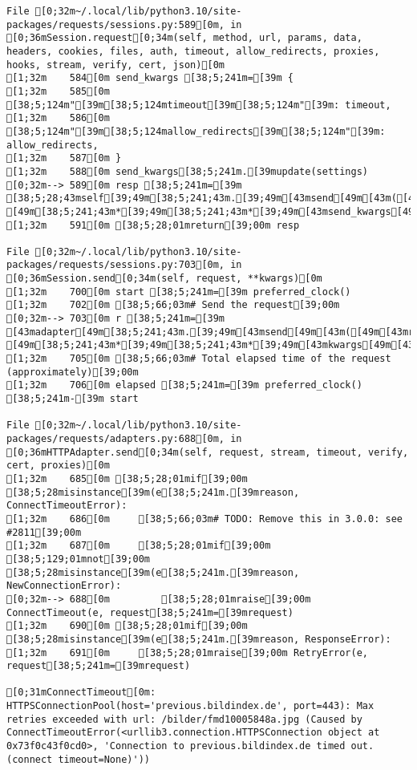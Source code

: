 \documentclass[
  a4paper,
  portrait]{book}
\begin{document}
\begin{verbatim}
File [0;32m~/.local/lib/python3.10/site-packages/requests/sessions.py:589[0m, in [0;36mSession.request[0;34m(self, method, url, params, data, headers, cookies, files, auth, timeout, allow_redirects, proxies, hooks, stream, verify, cert, json)[0m
[1;32m    584[0m send_kwargs [38;5;241m=[39m {
[1;32m    585[0m     [38;5;124m"[39m[38;5;124mtimeout[39m[38;5;124m"[39m: timeout,
[1;32m    586[0m     [38;5;124m"[39m[38;5;124mallow_redirects[39m[38;5;124m"[39m: allow_redirects,
[1;32m    587[0m }
[1;32m    588[0m send_kwargs[38;5;241m.[39mupdate(settings)
[0;32m--> 589[0m resp [38;5;241m=[39m [38;5;28;43mself[39;49m[38;5;241;43m.[39;49m[43msend[49m[43m([49m[43mprep[49m[43m,[49m[43m [49m[38;5;241;43m*[39;49m[38;5;241;43m*[39;49m[43msend_kwargs[49m[43m)[49m
[1;32m    591[0m [38;5;28;01mreturn[39;00m resp

File [0;32m~/.local/lib/python3.10/site-packages/requests/sessions.py:703[0m, in [0;36mSession.send[0;34m(self, request, **kwargs)[0m
[1;32m    700[0m start [38;5;241m=[39m preferred_clock()
[1;32m    702[0m [38;5;66;03m# Send the request[39;00m
[0;32m--> 703[0m r [38;5;241m=[39m [43madapter[49m[38;5;241;43m.[39;49m[43msend[49m[43m([49m[43mrequest[49m[43m,[49m[43m [49m[38;5;241;43m*[39;49m[38;5;241;43m*[39;49m[43mkwargs[49m[43m)[49m
[1;32m    705[0m [38;5;66;03m# Total elapsed time of the request (approximately)[39;00m
[1;32m    706[0m elapsed [38;5;241m=[39m preferred_clock() [38;5;241m-[39m start

File [0;32m~/.local/lib/python3.10/site-packages/requests/adapters.py:688[0m, in [0;36mHTTPAdapter.send[0;34m(self, request, stream, timeout, verify, cert, proxies)[0m
[1;32m    685[0m [38;5;28;01mif[39;00m [38;5;28misinstance[39m(e[38;5;241m.[39mreason, ConnectTimeoutError):
[1;32m    686[0m     [38;5;66;03m# TODO: Remove this in 3.0.0: see #2811[39;00m
[1;32m    687[0m     [38;5;28;01mif[39;00m [38;5;129;01mnot[39;00m [38;5;28misinstance[39m(e[38;5;241m.[39mreason, NewConnectionError):
[0;32m--> 688[0m         [38;5;28;01mraise[39;00m ConnectTimeout(e, request[38;5;241m=[39mrequest)
[1;32m    690[0m [38;5;28;01mif[39;00m [38;5;28misinstance[39m(e[38;5;241m.[39mreason, ResponseError):
[1;32m    691[0m     [38;5;28;01mraise[39;00m RetryError(e, request[38;5;241m=[39mrequest)

[0;31mConnectTimeout[0m: HTTPSConnectionPool(host='previous.bildindex.de', port=443): Max retries exceeded with url: /bilder/fmd10005848a.jpg (Caused by ConnectTimeoutError(<urllib3.connection.HTTPSConnection object at 0x73f0c43f0cd0>, 'Connection to previous.bildindex.de timed out. (connect timeout=None)'))
\end{verbatim}
\end{document}
